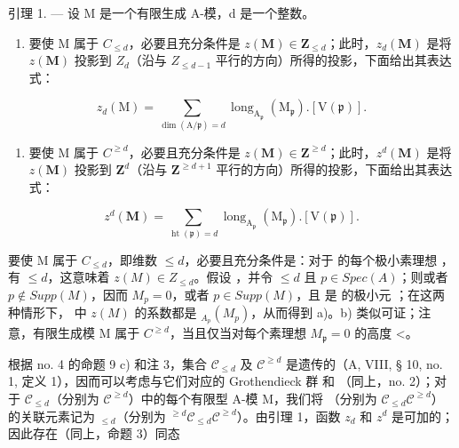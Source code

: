 引理 1. --- 设 M 是一个有限生成 A-模，d 是一个整数。

\begin{enumerate}
\def\labelenumi{\alph{enumi})}
\tightlist
\item
  要使 M 属于 \(C_{\leq d}\)，必要且充分条件是 \(z(\mathbf{M}) \in \mathbf{Z}_{\leq d}\)；此时，\(z_{d}(\mathbf{M})\) 是将 \(z(\mathbf{M})\) 投影到 \(Z_{d}\)（沿与 \(Z_{\leq d-1}\) 平行的方向）所得的投影，下面给出其表达式：
\end{enumerate}

\[
z _ {d} (\mathrm{M}) = \sum _ {\dim (\mathrm{A} / \mathfrak {p}) = d} \operatorname{long} _ {\mathrm{A} _ {\mathfrak {p}}} (\mathrm{M} _ {\mathfrak {p}}). [ \mathrm{V} (\mathfrak {p}) ].
\]

\begin{enumerate}
\def\labelenumi{\alph{enumi})}
\setcounter{enumi}{1}
\tightlist
\item
  要使 M 属于 \(C^{\geq d}\)，必要且充分条件是 \(z(\mathbf{M})\in\mathbf{Z}^{\geq d}\)；此时，\(z^{d}(\mathbf{M})\) 是将 \(z(\mathbf{M})\) 投影到 \(\mathbf{Z}^{d}\)（沿与 \(\mathbf{Z}^{\geq d+1}\) 平行的方向）所得的投影，下面给出其表达式：
\end{enumerate}

\[
z ^ {d} (\mathbf {M}) = \sum _ {\operatorname{ht} (\mathfrak {p}) = d} \operatorname{long} _ {\mathrm{A} _ {\mathfrak {p}}} (\mathrm{M} _ {\mathfrak {p}}). [ \mathrm{V} (\mathfrak {p}) ].
\]

要使 M 属于 \(C_{\leq d}\)，即维数 \(\leq d\)，必要且充分条件是：对于  的每个极小素理想  ，有 \(\leq d\)，这意味着 \(z(M) \in Z_{\leq d}\)。假设  ，并令 \(\leq d\) 且 \(p \in Spec(A)\)；则或者 \(p \notin Supp(M)\)，因而 \(M_p = 0\)，或者 \(p \in Supp(M)\)，且 { 是  的极小元 }；在这两种情形下，{} 中 \(z(M)\) 的系数都是 \(_{A_p}(M_p)\)，从而得到 a)。b) 类似可证；注意，有限生成模 M 属于 \(C^{\geq d}\)，当且仅当对每个素理想 \(M_{\mathfrak{p}} = 0\) 的高度 \textless{}。

根据 no. 4 的命题 9 c) 和注 3，集合 \(\mathcal{C}_{\leq d}\) 及 \(\mathcal{C}^{\geq d}\) 是遗传的（A, VIII, § 10, no. 1, 定义 1），因而可以考虑与它们对应的 Grothendieck 群  和  （同上，no. 2）；对于 \(\mathcal{C}_{\leq d}\)（分别为 \(\mathcal{C}^{\geq d}\)）中的每个有限型 A-模 M，我们将  （分别为 \(\mathcal{C}_{\leq d}\)\(\mathcal{C}^{\geq d}\){）的关联元素记为 }{}\(_{\leq d}\)（分别为 {}{}\(^{\geq d}\)\(\mathcal{C}_{\leq d}\)\(\mathcal{C}^{\geq d}\)）。由引理 1，函数 \(z_{d}\) 和 \(z^{d}\) 是可加的；因此存在（同上，命题 3）同态

